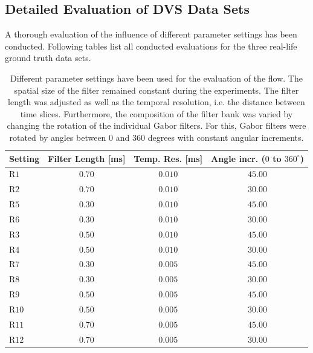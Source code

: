 \newpage
\begin{appendix}
\chapter{Detailed Evaluation of DVS Data Sets}
A thorough evaluation of the influence of different parameter settings has been conducted. Following tables list all conducted evaluations for the three real-life ground truth data sets.


\begin{table}[tb]
	\centering
		\begin{tabular}{lccc}
Setting & Filter Length [ms] & Temp. Res. [ms] & Angle incr. ($0$ to $360^\circ$) \\
\hline  \hline
R$1$ & $0.70$ & $0.010$ & $45.00$\\
R$2$ & $0.70$ & $0.010$ & $30.00$\\
R$5$ & $0.30$ & $0.010$ & $45.00$\\
R$6$ & $0.30$ & $0.010$ & $30.00$\\
R$3$ & $0.50$ & $0.010$ & $45.00$\\
R$4$ & $0.50$ & $0.010$ & $30.00$\\
R$7$ & $0.30$ & $0.005$ & $45.00$\\
R$8$ & $0.30$ & $0.005$ & $30.00$\\
R$9$ & $0.50$ & $0.005$ & $45.00$\\
R$10$ & $0.50$ & $0.005$ & $30.00$\\
R$11$ & $0.70$ & $0.005$ & $45.00$\\
R$12$ & $0.70$ & $0.005$ & $30.00$\\
		\end{tabular}
	\caption[Different parameter settings for the evaluations]{Different parameter settings have been used for the evaluation of the flow.
	 The spatial size of the filter remained constant during the experiments.
	 The filter length was adjusted as well as the temporal resolution, i.e. the distance between time slices. 
	 Furthermore, the composition of the filter bank was varied by changing the rotation of the individual Gabor filters. 
	 For this, Gabor filters were rotated by angles between $0$ and $360$ degrees with constant angular increments.}
	\label{tab:app_parameter_settings}
\end{table}




\end{appendix}
